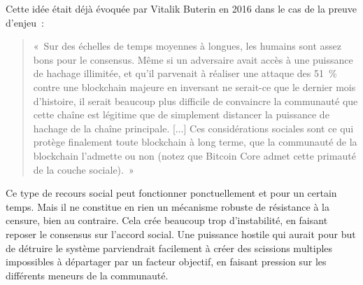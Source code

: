 Cette idée était déjà évoquée par Vitalik Buterin en 2016 dans le cas de la preuve d'enjeu~:

\begin{quote}
«~Sur des échelles de temps moyennes à longues, les humains sont assez bons pour le consensus. Même si un adversaire avait accès à une puissance de hachage illimitée, et qu'il parvenait à réaliser une attaque des 51~\% contre une blockchain majeure en inversant ne serait-ce que le dernier mois d'histoire, il serait beaucoup plus difficile de convaincre la communauté que cette chaîne est légitime que de simplement distancer la puissance de hachage de la chaîne principale. [...] Ces considérations sociales sont ce qui protège finalement toute blockchain à long terme, que la communauté de la blockchain l'admette ou non (notez que Bitcoin Core admet cette primauté de la couche sociale).~»
\end{quote}

%

Ce type de recours social peut fonctionner ponctuellement et pour un certain temps. Mais il ne constitue en rien un mécanisme robuste de résistance à la censure, bien au contraire. Cela crée beaucoup trop d'instabilité, en faisant reposer le consensus sur l'accord social. Une puissance hostile qui aurait pour but de détruire le système parviendrait facilement à créer des scissions multiples impossibles à départager par un facteur objectif, en faisant pression sur les différents meneurs de la communauté.

